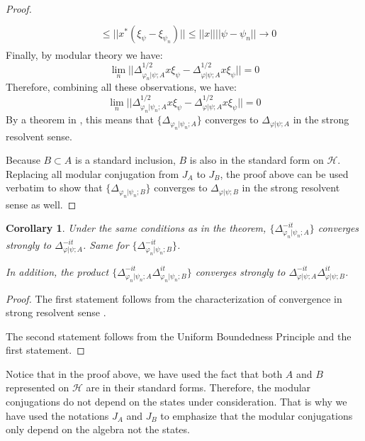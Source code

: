 \documentclass[a4paper,11pt]{article}
\newtheorem{corollary}[theorem]{Corollary}
\theoremstyle{definition}
\begin{document}
\begin{proof}
\begin{align}
\begin{split}
            \\&
            \leq ||x^*(\xi_\psi - \xi_{\psi_n})|| \leq ||x||||\psi - \psi_n||\rightarrow 0
        \end{split}
    \end{align}
    Finally, by modular theory we have:
    \begin{equation}
        \lim_n||\Delta^{1/2}_{\varphi_n|\psi;A}x\xi_\psi - \Delta^{1/2}_{\varphi|\psi;A}x\xi_\psi|| = 0
    \end{equation}
    Therefore, combining all these observations, we have:
    \begin{equation}
        \lim_n||\Delta^{1/2}_{\varphi_n|\psi_n;A}x\xi_\psi - \Delta^{1/2}_{\varphi|\psi;A}x\xi_\psi|| = 0
    \end{equation}
    By a theorem in \cite{takesaki2}, this means that $\{\Delta_{\varphi_n|\psi_n;A}\}$ converges to $\Delta_{\varphi|\psi;A}$ in the strong resolvent sense. 

    Because $B\subset A$ is a standard inclusion, $B$ is also in the standard form on $\mathcal{H}$. Replacing all modular conjugation from $J_A$ to $J_B$, the proof above can be used verbatim to show that $\{\Delta_{\varphi_n|\psi_n;B}\}$ converges to $\Delta_{\varphi|\psi;B}$ in the strong resolvent sense as well.
\end{proof}
\begin{corollary}
    Under the same conditions as in the theorem, $\{\Delta^{-it}_{\varphi_n|\psi_n;A}\}$ converges strongly to $\Delta^{-it}_{\varphi|\psi;A}$. Same for $\{\Delta^{-it}_{\varphi_n|\psi_n;B}\}$.

    In addition, the product $\{\Delta^{-it}_{\varphi_n|\psi_n;A}\Delta^{it}_{\varphi_n|\psi_n;B}\}$ converges strongly to $\Delta^{-it}_{\varphi|\psi;A}\Delta^{it}_{\varphi|\psi;B}$.
\end{corollary}
\begin{proof}
    The first statement follows from the characterization of convergence in strong resolvent sense \cite{takesaki2}.

    The second statement follows from the Uniform Boundedness Principle and the first statement.
\end{proof}
Notice that in the proof above, we have used the fact that both $A$ and $B$ represented on $\mathcal{H}$ are in their standard forms. Therefore, the modular conjugations do not depend on the states under consideration. That is why we have used the notations $J_A$ and $J_B$ to emphasize that the modular conjugations only depend on the algebra not the states.
\end{document}
